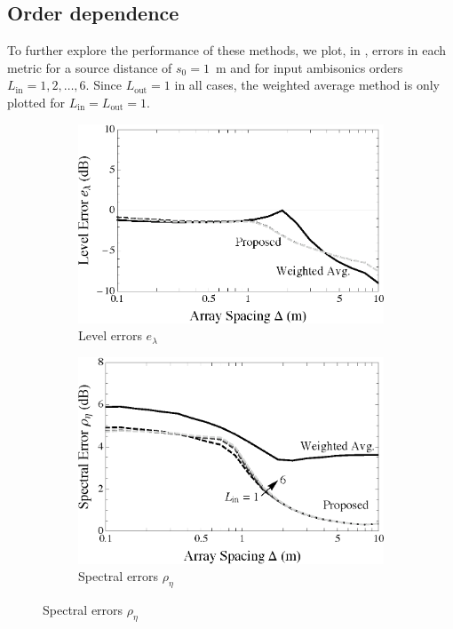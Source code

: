 \subsection{Order dependence}\label{sec:08_Proposed_Method:Order_Dependence}
To further explore the performance of these methods, we plot, in , errors in each metric for a source distance of $s_0 = 1$~m and for input ambisonics orders $L_\textrm{in} = 1,2,\dots,6$.
Since $L_\textrm{out} = 1$ in all cases, the weighted average method is only plotted for $L_\textrm{in} = L_\textrm{out} = 1$.

\begin{figure}[t]
    	\centering
	\begin{subfigure}[b]{0.49\textwidth}
        		\includegraphics[width=\textwidth]{08_proposed_method/figures/audibleEnergy_order.eps}
        		\caption{Level errors $e_\lambda$}
        		\label{fig:08_Proposed_Method:Level_Errors:Order}
    	\end{subfigure}
	\hfill
    	\begin{subfigure}[b]{0.49\textwidth}
        		\includegraphics[width=\textwidth]{08_proposed_method/figures/scharer2009_order.eps}
        		\caption{Spectral errors $\rho_\eta$}
        		\label{fig:08_Proposed_Method:Spectral_Errors:Order}
    	\end{subfigure}
	

\end{figure}
